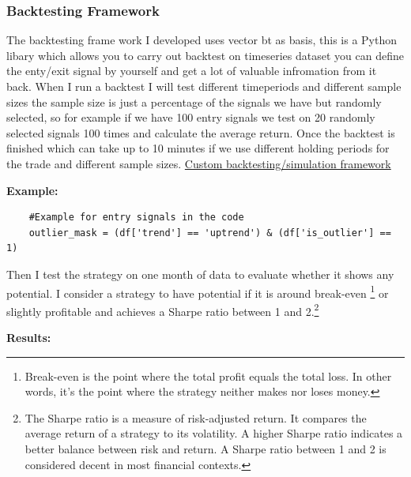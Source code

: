 \documentclass[12pt]{article}
\begin{document}
\subsubsection{Backtesting Framework}
The backtesting frame work I developed uses vector bt as basis, this is a Python libary which allows you to carry out backtest on timeseries dataset you can define the enty/exit signal by yourself and get a lot of valuable infromation from it back.
When I run a backtest I will test different timeperiods and different sample sizes the sample size is just a percentage of the signals we have but randomly selected, so for example if we have 100 entry signals we test on 20 randomly selected signals 100 times and calculate the average return.
Once the backtest is finished which can take up to 10 minutes if we use different holding periods for the trade and different sample sizes.  \href{https://github.com/AJslashTracey/signal_search_strategy}{Custom backtesting/simulation framework}

\textbf{Example:}

\begin{verbatim}
    #Example for entry signals in the code
    outlier_mask = (df['trend'] == 'uptrend') & (df['is_outlier'] == 1) 
\end{verbatim}

Then I test the strategy on one month of data to evaluate whether it shows any potential. I consider a strategy to have potential if it is around break-even \footnote{Break-even is the point where the total profit equals the total loss. In other words, it's the point where the strategy neither makes nor loses money.} or slightly profitable and achieves a Sharpe ratio between 1 and 2.\footnote{The Sharpe ratio is a measure of risk-adjusted return. It compares the average return of a strategy to its volatility. A higher Sharpe ratio indicates a better balance between risk and return. A Sharpe ratio between 1 and 2 is considered decent in most financial contexts.}


\textbf{Results:}
\end{document}
